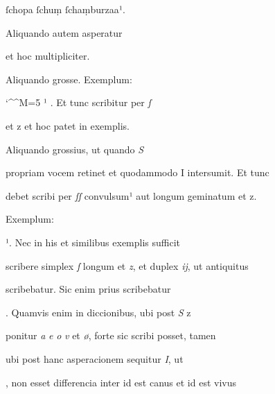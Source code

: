 ſchopa ſchuṃ ſchaṃburzaa¹.

\indentK Aliquando autem asperatur

\splitlines

et hoc multipliciter.

\indentK Aliquando grosse. Exemplum:  

\fulllines

\catcode `\^^M=5
\obeylines
{}  ¹ . Et tunc scribitur per \textit{ſ} 

\splitlines

 et z et hoc patet in exemplis.

Aliquando grossius, ut quando \textit{S}

\fulllines

propriam vocem retinet et quodammodo I intersumit. Et tunc

debet scribi per \textit{ſſ} convulsum¹ aut longum geminatum et z.


Exemplum:      

 ¹. Nec in his et similibus exemplis sufficit


scribere simplex \textit{ſ} longum et \textit{z}, et duplex \textit{ij}, ut antiquitus

scribebatur. Sic enim prius scribebatur  

. Quamvis enim in diccionibus, ubi post \textit{S} z


ponitur \textit{a} \textit{e} \textit{o} \textit{v} et \textit{ø}, forte sic scribi posset, tamen

ubi post hanc asperacionem sequitur \textit{I}, ut  

, non esset differencia inter  id est canus et  id est vivus


